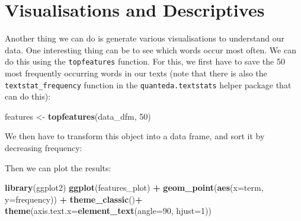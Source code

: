\documentclass[
]{book}
\newenvironment{Shaded}{\begin{snugshade}}{\end{snugshade}}
\newcommand{\AttributeTok}[1]{\textcolor[rgb]{0.13,0.29,0.53}{#1}}
\newcommand{\DecValTok}[1]{\textcolor[rgb]{0.00,0.00,0.81}{#1}}
\newcommand{\FunctionTok}[1]{\textcolor[rgb]{0.13,0.29,0.53}{\textbf{#1}}}
\newcommand{\NormalTok}[1]{#1}
\newcommand{\OtherTok}[1]{\textcolor[rgb]{0.56,0.35,0.01}{#1}}
\newcommand{\SpecialCharTok}[1]{\textcolor[rgb]{0.81,0.36,0.00}{\textbf{#1}}}
\begin{document}
\section{Visualisations and Descriptives}\label{visualisations-and-descriptives}

Another thing we can do is generate various visualisations to understand our data. One interesting thing can be to see which words occur most often. We can do this using the \texttt{topfeatures} function. For this, we first have to save the 50 most frequently occurring words in our texts (note that there is also the \texttt{textstat\_frequency} function in the \texttt{quanteda.textstats} helper package that can do this):

\begin{Shaded}
\begin{Highlighting}[]
\NormalTok{features }\OtherTok{\textless{}{-}} \FunctionTok{topfeatures}\NormalTok{(data\_dfm, }\DecValTok{50}\NormalTok{)}
\end{Highlighting}
\end{Shaded}

We then have to transform this object into a data frame, and sort it by decreasing frequency:

\begin{Shaded}
\end{Shaded}

Then we can plot the results:

\begin{Shaded}
\begin{Highlighting}[]
\FunctionTok{library}\NormalTok{(ggplot2)}
\FunctionTok{ggplot}\NormalTok{(features\_plot) }\SpecialCharTok{+} 
 \FunctionTok{geom\_point}\NormalTok{(}\FunctionTok{aes}\NormalTok{(}\AttributeTok{x=}\NormalTok{term, }\AttributeTok{y=}\NormalTok{frequency)) }\SpecialCharTok{+}
 \FunctionTok{theme\_classic}\NormalTok{()}\SpecialCharTok{+}
 \FunctionTok{theme}\NormalTok{(}\AttributeTok{axis.text.x=}\FunctionTok{element\_text}\NormalTok{(}\AttributeTok{angle=}\DecValTok{90}\NormalTok{, }\AttributeTok{hjust=}\DecValTok{1}\NormalTok{))}
\end{Highlighting}
\end{Shaded}
\end{document}
